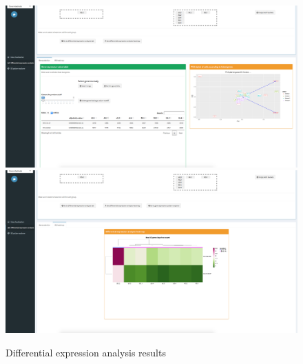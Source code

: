 \documentclass{report}
\begin{document}
{\begin{figure}[H]
\centering
\subfigure\includegraphics[scale=0.2]{application/pvalue-results.png}
\subfigure\includegraphics[scale=0.2]{application/de-results.png}
\caption{Differential expression analysis results}
\label{de}
\end{figure}

}
\end{document}
